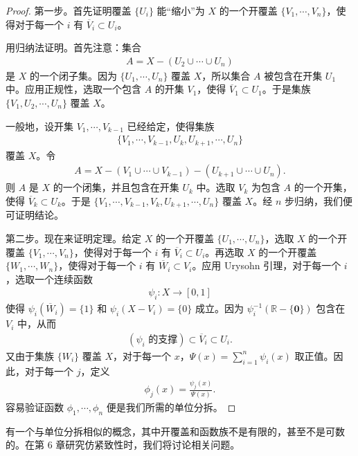 \begin{proof}
第一步。首先证明覆盖 $\{U_{i}\}$ 能``缩小''为 $X$ 的一个开覆盖 $\{V_{1},\cdots,V_{n}\}$，使得对于每一个 $i$ 有 $\overline{V}_{i}\subset U_{i}$。

用归纳法证明。首先注意：集合
\begin{align*}
A=X-(U_{2}\cup\cdots\cup U_{n})
\end{align*}
是 $X$ 的一个闭子集。因为 $\{U_{1},\cdots,U_{n}\}$ 覆盖 $X$，所以集合 $A$ 被包含在开集 $U_{1}$ 中。应用正规性，选取一个包含 $A$ 的开集 $V_{1}$，使得 $\overline{V}_{1}\subset U_{1}$。于是集族 $\{V_{1},U_{2},\cdots,U_{n}\}$ 覆盖 $X$。

一般地，设开集 $V_{1},\cdots,V_{k-1}$ 已经给定，使得集族
\begin{align*}
\{V_{1},\cdots,V_{k-1},U_{k},U_{k+1},\cdots,U_{n}\}
\end{align*}
覆盖 $X$。令
\begin{align*}
A=X-(V_{1}\cup\cdots\cup V_{k-1})-(U_{k+1}\cup\cdots\cup U_{n}).
\end{align*}
则 $A$ 是 $X$ 的一个闭集，并且包含在开集 $U_{k}$ 中。选取 $V_{k}$ 为包含 $A$ 的一个开集，使得 $\overline{V}_{k}\subset U_{k}$。于是 $\{V_{1},\cdots,V_{k-1},V_{k},U_{k+1},\cdots,U_{n}\}$ 覆盖 $X$。经 $n$ 步归纳，我们便可证明结论。

第二步。现在来证明定理。给定 $X$ 的一个开覆盖 $\{U_{1},\cdots,U_{n}\}$，选取 $X$ 的一个开覆盖 $\{V_{1},\cdots,V_{n}\}$，使得对于每一个 $i$ 有 $\overline{V}_{i}\subset U_{i}$。再选取 $X$ 的一个开覆盖 $\{W_{1},\cdots,W_{n}\}$，使得对于每一个 $i$ 有 $\overline{W}_{i}\subset V_{i}$。应用 Urysohn 引理，对于每一个 $i$，选取一个连续函数
\begin{align*}
\psi_{i}\colon X\longrightarrow[0,1]
\end{align*}
使得 $\psi_{i}(\overline{W}_{i})=\{1\}$ 和 $\psi_{i}(X-V_{i})=\{0\}$ 成立。因为 $\psi_{i}^{-1}(\mathbb{R}-\{\boldsymbol{0}\})$ 包含在 $V_{i}$ 中，从而
\begin{align*}
(\psi_{i}\text{ 的支撑})\subset\overline{V}_{i}\subset U_{i}.
\end{align*}
又由于集族 $\{W_{i}\}$ 覆盖 $X$，对于每一个 $x$，$\Psi(x)=\sum_{i=1}^{n}\psi_{i}(x)$ 取正值。因此，对于每一个 $j$，定义
\begin{align*}
\phi_{j}(x)=\frac{\psi_{j}(x)}{\Psi(x)}.
\end{align*}
容易验证函数 $\phi_{1},\cdots,\phi_{n}$ 便是我们所需的单位分拆。
\end{proof}

有一个与单位分拆相似的概念，其中开覆盖和函数族不是有限的，甚至不是可数的。在第 6 章研究仿紧致性时，我们将讨论相关问题。


